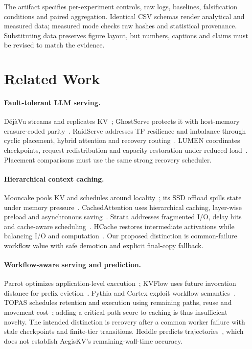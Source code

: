 \documentclass[sigplan,10pt,anonymous,nonacm]{acmart}
\begin{document}
The artifact specifies per-experiment controls, raw logs, baselines,
falsification conditions and paired aggregation. Identical CSV schemas
render analytical and measured data; measured mode checks raw hashes and
statistical provenance. Substituting data preserves figure layout, but
numbers, captions and claims must be revised to match the evidence.

\section{Related Work}
\label{sec:related}

\paragraph{Fault-tolerant LLM serving.}
D\'ej\`aVu streams and replicates KV~\cite{strati2024dejavu}; GhostServe
protects it with host-memory erasure-coded parity~\cite{jayakody2026ghostserve}.
RaidServe addresses TP resilience and imbalance through cyclic placement,
hybrid attention and recovery routing~\cite{xu2026raidserve}. LUMEN
coordinates checkpoints, request redistribution and capacity restoration
under reduced load~\cite{cao2026lumen}. Placement comparisons must use the same strong recovery scheduler.

\paragraph{Hierarchical context caching.}
Mooncake pools KV and schedules around locality~\cite{qin2025mooncake};
its SSD offload spills state under memory pressure~\cite{mooncake2026ssdoffload}.
CachedAttention uses hierarchical caching, layer-wise preload and
asynchronous saving~\cite{gao2024cachedattention}. Strata addresses
fragmented I/O, delay hits and cache-aware scheduling~\cite{xie2026strata}.
HCache restores intermediate activations while balancing I/O and
computation~\cite{gao2025hcache}. Our proposed distinction is common-failure workflow value
with safe demotion and explicit final-copy fallback.

\paragraph{Workflow-aware serving and prediction.}
Parrot optimizes application-level execution~\cite{lin2024parrot}; KVFlow
uses future invocation distance for prefix eviction~\cite{pan2025kvflow}.
Pythia and Cortex exploit workflow semantics~\cite{yu2026pythia,pagonas2025cortex}.
TOPAS schedules retention and execution using remaining paths, reuse and
movement cost~\cite{ni2026topas}; adding a critical-path score to caching
is thus insufficient novelty. The intended distinction is recovery after
a common worker failure with stale checkpoints and finite-tier transitions.
Heddle predicts trajectories~\cite{zhang2026heddle}, which does not establish
AegisKV's remaining-wall-time accuracy.
\end{document}
